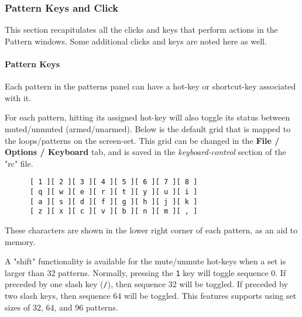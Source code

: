 
\subsubsection{Pattern Keys and Click}
\label{subsubsec:patterns_pattern_keys_and_clicks}

   This section recapitulates all the clicks and keys that perform actions
   in the Pattern windows.  Some additional clicks and keys are noted here
   as well.

\paragraph{Pattern Keys}
\label{paragraph:patterns_pattern_keys}

   Each pattern in the patterns panel can have a hot-key or shortcut-key
   associated with it.

   For each pattern, hitting its assigned hot-key will
   also toggle its status between muted/unmuted (armed/unarmed).
   Below is the default grid that is
   mapped to the loops/patterns on the screen-set.
   This grid can be changed in the
   \textbf{File / Options / Keyboard} tab, and is
   saved in the \textsl{keyboard-control} section of the
   "rc" file.

   \begin{verbatim}
      [ 1 ][ 2 ][ 3 ][ 4 ][ 5 ][ 6 ][ 7 ][ 8 ]
      [ q ][ w ][ e ][ r ][ t ][ y ][ u ][ i ]
      [ a ][ s ][ d ][ f ][ g ][ h ][ j ][ k ]
      [ z ][ x ][ c ][ v ][ b ][ n ][ m ][ , ]
   \end{verbatim}

   These characters are shown in the lower right corner of each
   pattern, as an aid to memory.

   A "shift" functionality is available for the
   mute/unmute hot-keys when a set is larger than 32 patterns.
   Normally, pressing the \texttt{1} key will toggle
   sequence 0.  If preceded by one slash key (\texttt{/}), then sequence 32
   will be toggled.  If preceded by two slash keys, then sequence 64 will be
   toggled.  This features supports using set sizes of 32, 64, and 96 patterns.

